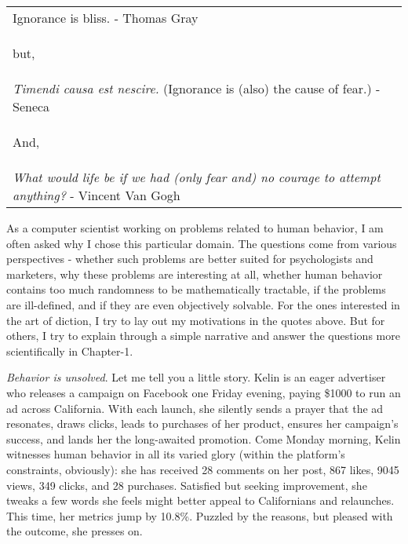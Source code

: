 \documentclass[PhD]{iiitd}
\begin{document}
\begin{table}[!th]
\begin{tabularx}{1\textwidth}{X}
        Ignorance is bliss. - Thomas Gray\\
        
        \begin{center}
                but,
        \end{center}\\

        \textit{Timendi causa est nescire.} (Ignorance is (also) the cause of fear.) - Seneca\\

        \begin{center}
                And,
        \end{center}\\
        
        \textit{What would life be if we had (only fear and) no courage to attempt anything?} - Vincent Van Gogh\\
        
    \end{tabularx}
    
\end{table}


As a computer scientist working on problems related to human behavior, I am often asked why I chose this particular domain. The questions come from various perspectives - whether such problems are better suited for psychologists and marketers, why these problems are interesting at all, whether human behavior contains too much randomness to be mathematically tractable, if the problems are ill-defined, and if they are even objectively solvable. For the ones interested in the art of diction, I try to lay out my motivations in the quotes above. But for others, I try to explain through a simple narrative and answer the questions more scientifically in Chapter-1. 



\textit{Behavior is unsolved}. Let me tell you a little story. Kelin is an eager advertiser who releases a campaign on Facebook one Friday evening, paying \$1000 to run an ad across California. With each launch, she silently sends a prayer that the ad resonates, draws clicks, leads to purchases of her product, ensures her campaign's success, and lands her the long-awaited promotion. Come Monday morning, Kelin witnesses human behavior in all its varied glory (within the platform's constraints, obviously): she has received 28 comments on her post, 867 likes, 9045 views, 349 clicks, and 28 purchases. Satisfied but seeking improvement, she tweaks a few words she feels might better appeal to Californians and relaunches. This time, her metrics jump by 10.8\%. Puzzled by the reasons, but pleased with the outcome, she presses on.
\end{document}
